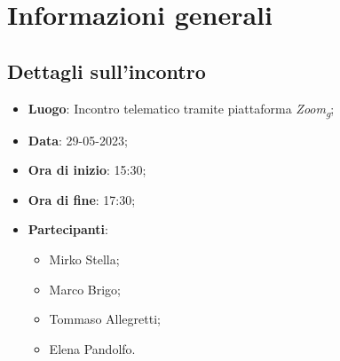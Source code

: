 \section{Informazioni generali}

\subsection{Dettagli sull'incontro}
\begin{itemize}
\item \textbf{Luogo}: Incontro telematico tramite piattaforma \textit{Zoom\textsubscript{g}};
\item \textbf{Data}: 29-05-2023;
\item \textbf{Ora di inizio}: 15:30;
\item \textbf{Ora di fine}: 17:30;
\item \textbf{Partecipanti}: 
\begin{itemize}
	\item Mirko Stella;
	\item Marco Brigo;
	\item Tommaso Allegretti;
	\item Elena Pandolfo.
\end{itemize}
\end{itemize}